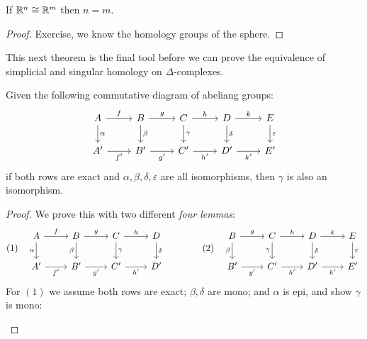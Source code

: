 \documentclass[a4paper]{article}
\begin{document}
\begin{theorem}
    If $\mathbb{R}^n\cong\mathbb{R}^m$ then $n=m$.
    \begin{proof}
        Exercise, we know the homology groups of the sphere.
    \end{proof}
\end{theorem}
This next theorem is the final tool before we can prove the equivalence of simplicial and singular homology on $\Delta$-complexes.
\begin{theorem}
    Given the following commutative diagram of abeliang groups:\[\begin{tikzcd}
        A \arrow[r, "f"] \arrow[d, "\alpha"] &
        B \arrow[r, "g"] \arrow[d, "\beta"] &
        C \arrow[r, "h"] \arrow[d, "\gamma"] &
        D \arrow[r, "k"] \arrow[d, "\delta"] &
        E \arrow[d, "\varepsilon"] \\
        A' \arrow[r, "f'", swap] &
        B' \arrow[r, "g'", swap] &
        C' \arrow[r, "h'", swap] &
        D' \arrow[r, "k'", swap] &
        E'
    \end{tikzcd}\]
    if both rows are exact and $\alpha,\beta,\delta,\varepsilon$ are all isomorphisms, then $\gamma$ is also an isomorphism.
    \begin{proof}
        We prove this with two different \textit{four lemmas}:\[
        (1)\quad
        \begin{tikzcd}
            A \arrow[r, "f"] \arrow[d, "\alpha", swap] &
            B \arrow[r, "g"] \arrow[d, "\beta", swap] &
            C \arrow[r, "h"] \arrow[d, "\gamma"] &
            D \arrow[d, "\delta"] \\
            A' \arrow[r, "f'", swap] &
            B' \arrow[r, "g'", swap] &
            C' \arrow[r, "h'", swap] &
            D'
        \end{tikzcd}
        \qquad \qquad
        (2)\quad
        \begin{tikzcd}
            B \arrow[r, "g"] \arrow[d, "\beta", swap] &
            C \arrow[r, "h"] \arrow[d, "\gamma", swap] &
            D \arrow[r, "k"] \arrow[d, "\delta"] &
            E \arrow[d, "\varepsilon"] \\
            B' \arrow[r, "g'", swap] &
            C' \arrow[r, "h'", swap] &
            D' \arrow[r, "k'", swap] &
            E'
        \end{tikzcd}
        \]
    For $(1)$ we assume both rows are exact; $\beta,\delta$ are mono; and $\alpha$ is epi, and show $\gamma$ is mono:
    \begin{itemize}

\end{itemize}
\end{proof}
\end{theorem}
\end{document}
